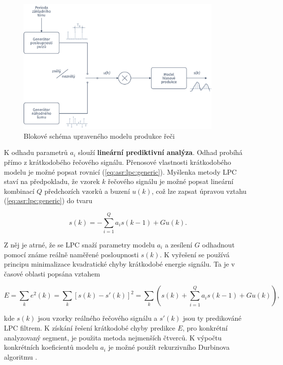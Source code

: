 \begin{figure}[hbpt]
  \centering
  \includegraphics[width=0.9\textwidth]{./ch4-asr/img/speech_process.pdf}
  \caption{Blokové schéma upraveného modelu produkce řeči}
  \label{fig:asr:model:speech:excitation}
\end{figure}

K odhadu parametrů $a_i$ slouží \textbf{lineární prediktivní analýza}. Odhad probíhá přímo z krátkodobého řečového signálu. Přenosové vlastnosti krátkodobého modelu je možné popsat rovnicí (\ref{eq:asr:lpc:generic}). Myšlenka metody LPC staví na předpokladu, že vzorek $k$ řečového signálu je možné popsat lineární kombinací $Q$ předchozích vzorků a buzení $u(k)$, což lze zapsat úpravou vztahu (\ref{eq:asr:lpc:generic}) do tvaru

\begin{equation}
  s(k) = - \sum_{i = 1}^{Q} a_i s(k-1) + Gu(k).
  \label{eq:asr:lpc:generic:edited}
\end{equation}

\noindent Z něj je atrné, že se LPC snaží parametry modelu $a_i$ a zesílení $G$ odhadnout pomocí známe reálně naměřené posloupnosti $s(k)$. K vyřešení se používá principu minimalizace kvadratické chyby krátkodobé energie signálu. Ta je v časové oblasti popsána vztahem

\begin{equation}
  E = \sum_{k} e^2(k) = \sum_{k} \left[ s(k) - s'(k)\right]^2 = \sum_{k} \left( s(k) + \sum_{i = 1}^{Q} a_i s(k-1) + Gu(k) \right),
\end{equation}

\noindent kde $s(k)$ jsou vzorky reálného řečového signálu a $s'(k)$ jsou ty predikováné LPC filtrem. K získání řešení krátkodobé chyby predikce $E$, pro konkrétní analyzovaný segment, je použita metoda nejmenších čtverců. K výpočtu konkrétních koeficientů modelu $a_i$ je možné použít rekurzivního Durbinova algoritmu \cite{Holmes2001}.

